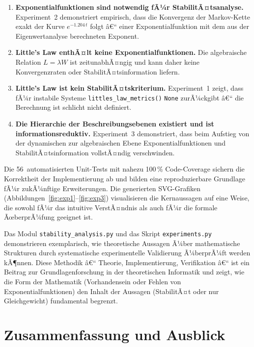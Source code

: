 ﻿\documentclass[a4paper,12pt]{scrreprt}
\theoremstyle{definition}
\begin{document}
\begin{enumerate}
	\item \textbf{Exponentialfunktionen sind notwendig fÃ¼r
		StabilitÃ¤tsanalyse.}  Experiment~2 demonstriert empirisch,
	dass die Konvergenz der Markov-Kette exakt der Kurve
	$e^{-1.204\,t}$ folgt â€“ einer Exponentialfunktion mit dem
	aus der Eigenwertanalyse berechneten Exponent.
	
	\item \textbf{Little's Law enthÃ¤lt keine Exponentialfunktionen.}
	Die algebraische Relation $L = \lambda W$ ist
	zeitunabhÃ¤ngig und kann daher keine Konvergenzraten oder
	StabilitÃ¤tsinformation liefern.
	
	\item \textbf{Little's Law ist kein StabilitÃ¤tskriterium.}
	Experiment~1 zeigt, dass fÃ¼r instabile Systeme \texttt{littles\_law\_metrics()}
	\texttt{None} zurÃ¼ckgibt â€“ die
	Berechnung ist schlicht nicht definiert.
	
	\item \textbf{Die Hierarchie der Beschreibungsebenen existiert
		und ist informationsreduktiv.}  Experiment~3 demonstriert,
	dass beim Aufstieg von der dynamischen zur algebraischen
	Ebene Exponentialfunktionen und StabilitÃ¤tsinformation
	vollstÃ¤ndig verschwinden.
\end{enumerate}

Die 56~automatisierten Unit-Tests mit nahezu 100\,\% Code-Coverage
sichern die Korrektheit der Implementierung ab und bilden eine
reproduzierbare Grundlage fÃ¼r zukÃ¼nftige Erweiterungen.  Die
generierten SVG-Grafiken (Abbildungen~\ref{fig:exp1}--\ref{fig:exp3})
visualisieren die Kernaussagen auf eine Weise, die sowohl fÃ¼r
das intuitive VerstÃ¤ndnis als auch fÃ¼r die formale ÃœberprÃ¼fung
geeignet ist.

Das Modul \texttt{stability\_analysis.py} und das Skript
\texttt{experiments.py} demonstrieren exemplarisch, wie theoretische
Aussagen Ã¼ber mathematische Strukturen durch systematische
experimentelle Validierung Ã¼berprÃ¼ft werden kÃ¶nnen.  Diese Methodik
â€“ Theorie, Implementierung, Verifikation â€“ ist ein Beitrag zur
Grundlagenforschung in der theoretischen Informatik und zeigt, wie
die Form der Mathematik (Vorhandensein oder Fehlen von
Exponentialfunktionen) den Inhalt der Aussagen (StabilitÃ¤t oder nur
Gleichgewicht) fundamental begrenzt.

\section{Zusammenfassung und Ausblick}
\end{document}
